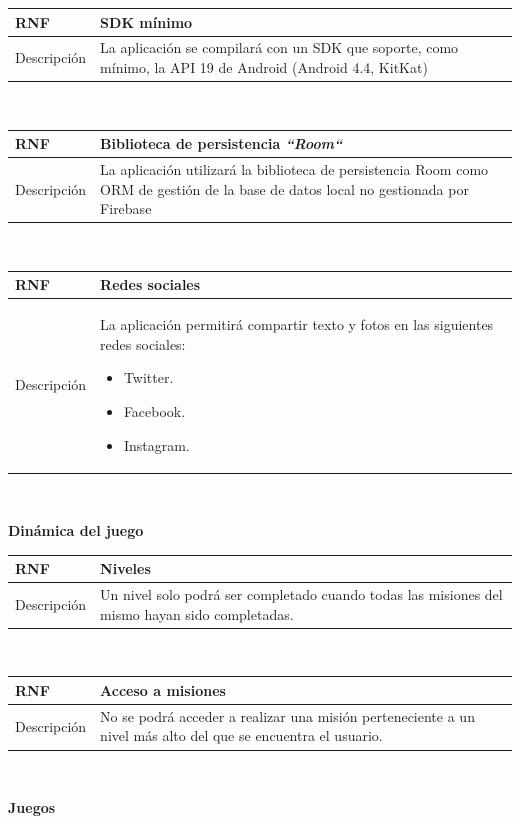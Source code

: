 \documentclass[twoside]{report}
\newcommand\addrow[2]{#1 &#2\\ }
\newcommand\addheading[2]{#1 &#2\\ \hline}
\newcommand\tabularhead{\begin{tabular}{lp{0.7\textwidth}}
\hline
}
\newenvironment{req}{\tabularhead}
{\hline\end{tabular}}
\begin{document}
\begin{req}
	\addheading{\textbf{RNF\arabic{nonFunctionalRequirements}}}{SDK mínimo}
	\addrow{Descripción}{La aplicación se compilará con un SDK que soporte, como mínimo, la API 19 de Android (Android 4.4, KitKat)\cite{androidversiondist}}
\end{req}\\

\begin{req}
	\addheading{\textbf{RNF\arabic{nonFunctionalRequirements}}}{Biblioteca de persistencia \textit{“Room“}}
	\addrow{Descripción}{La aplicación utilizará \cite{roompersistence} la biblioteca de persistencia Room como ORM de gestión de la base de datos local no gestionada por Firebase}
\end{req}\\

\begin{req}
	\addheading{\textbf{RNF\arabic{nonFunctionalRequirements}}}{Redes sociales}
	\addrow{Descripción}{La aplicación permitirá compartir texto y fotos en las siguientes redes sociales:
	\begin{itemize}
	\item Twitter.
	\item Facebook.
	\item Instagram.
	\end{itemize}}
\end{req}\\

\textbf{Dinámica del juego}

\begin{req}
	\addheading{\textbf{RNF\arabic{nonFunctionalRequirements}}}{Niveles}
	\addrow{Descripción}{Un nivel solo podrá ser completado cuando todas las misiones del mismo hayan sido completadas.}
\end{req}\\

\begin{req}
	\addheading{\textbf{RNF\arabic{nonFunctionalRequirements}}}{Acceso a misiones}
	\addrow{Descripción}{No se podrá acceder a realizar una misión perteneciente a un nivel más alto del que se encuentra el usuario.}
\end{req}\\

\textbf{Juegos}\\
\end{document}
